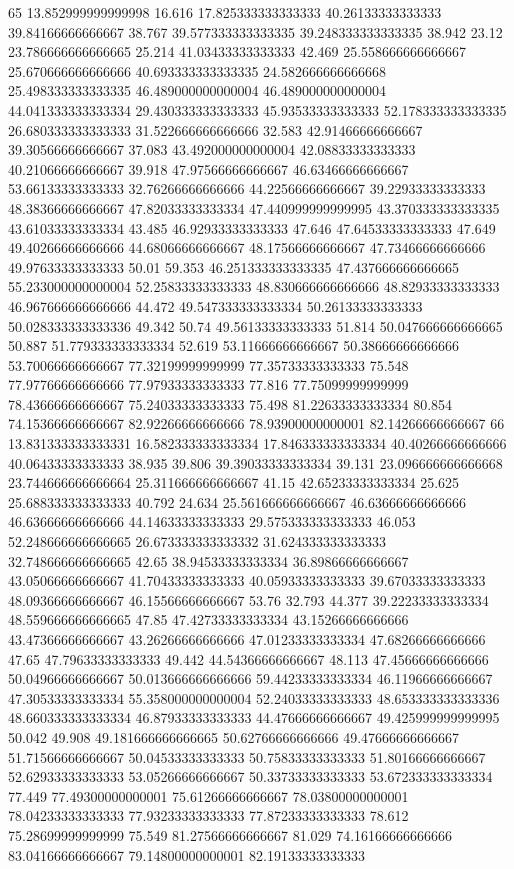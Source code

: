 65 13.852999999999998 16.616 17.825333333333333 40.26133333333333 39.84166666666667 38.767 39.577333333333335 39.248333333333335 38.942 23.12 23.786666666666665 25.214 41.03433333333333 42.469 25.558666666666667 25.670666666666666 40.693333333333335 24.582666666666668 25.498333333333335 46.489000000000004 46.489000000000004 44.041333333333334 29.430333333333333 45.93533333333333 52.178333333333335 26.680333333333333 31.522666666666666 32.583 42.91466666666667 39.30566666666667 37.083 43.492000000000004 42.08833333333333 40.21066666666667 39.918 47.97566666666667 46.63466666666667 53.66133333333333 32.76266666666666 44.22566666666667 39.22933333333333 48.38366666666667 47.82033333333334 47.440999999999995 43.370333333333335 43.61033333333334 43.485 46.92933333333333 47.646 47.64533333333333 47.649 49.40266666666666 44.68066666666667 48.17566666666667 47.73466666666666 49.97633333333333 50.01 59.353 46.251333333333335 47.437666666666665 55.233000000000004 52.25833333333333 48.830666666666666 48.82933333333333 46.967666666666666 44.472 49.547333333333334 50.26133333333333 50.028333333333336 49.342 50.74 49.56133333333333 51.814 50.047666666666665 50.887 51.779333333333334 52.619 53.11666666666667 50.38666666666666 53.70066666666667 77.32199999999999 77.35733333333333 75.548 77.97766666666666 77.97933333333333 77.816 77.75099999999999 78.43666666666667 75.24033333333333 75.498 81.22633333333334 80.854 74.15366666666667 82.92266666666666 78.93900000000001 82.14266666666667
66 13.831333333333331 16.582333333333334 17.846333333333334 40.40266666666666 40.06433333333333 38.935 39.806 39.39033333333334 39.131 23.096666666666668 23.744666666666664 25.311666666666667 41.15 42.65233333333334 25.625 25.688333333333333 40.792 24.634 25.561666666666667 46.63666666666666 46.63666666666666 44.14633333333333 29.575333333333333 46.053 52.248666666666665 26.673333333333332 31.624333333333333 32.748666666666665 42.65 38.94533333333334 36.89866666666667 43.05066666666667 41.70433333333333 40.05933333333333 39.67033333333333 48.09366666666667 46.15566666666667 53.76 32.793 44.377 39.22233333333334 48.559666666666665 47.85 47.42733333333334 43.15266666666666 43.47366666666667 43.26266666666666 47.01233333333334 47.68266666666666 47.65 47.79633333333333 49.442 44.54366666666667 48.113 47.45666666666666 50.04966666666667 50.013666666666666 59.44233333333334 46.11966666666667 47.30533333333334 55.358000000000004 52.24033333333333 48.653333333333336 48.660333333333334 46.87933333333333 44.47666666666667 49.425999999999995 50.042 49.908 49.181666666666665 50.62766666666666 49.47666666666667 51.71566666666667 50.04533333333333 50.75833333333333 51.80166666666667 52.62933333333333 53.05266666666667 50.33733333333333 53.672333333333334 77.449 77.49300000000001 75.61266666666667 78.03800000000001 78.04233333333333 77.93233333333333 77.87233333333333 78.612 75.28699999999999 75.549 81.27566666666667 81.029 74.16166666666666 83.04166666666667 79.14800000000001 82.19133333333333
